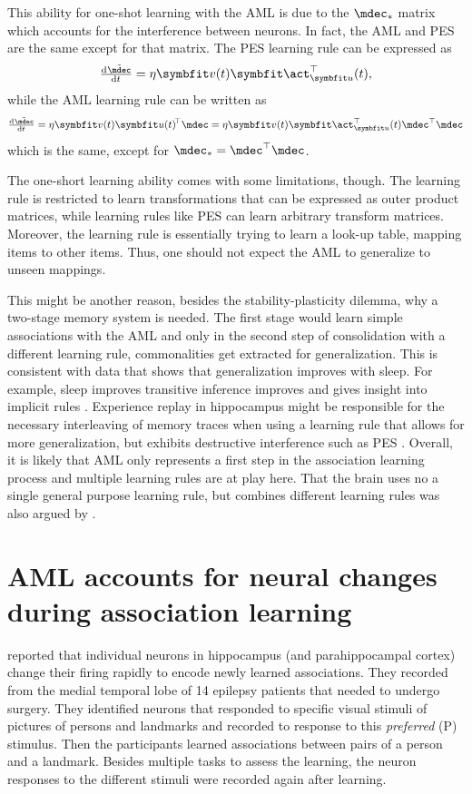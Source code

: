 This ability for one-shot learning with the AML is due to the $\mdec_*$ matrix which accounts for the interference between neurons.
In fact, the AML and PES are the same except for that matrix.
The PES learning rule can be expressed as
\begin{equation}
    \od{\tilde{\mdec}}{t} = \eta \vc v(t) \vc\act_{\vc u}\Tr(t) \text{,}
\end{equation}
while the AML learning rule can be written as
\begin{equation}
    \od{\tilde{\mdec}}{t} = \eta \vc v(t) \vc u(t)\!\Tr \mdec = \eta \vc v(t) \vc\act_{\vc u}\Tr(t) \mdec\Tr \mdec
\end{equation}
which is the same, except for $\mdec_* = \mdec\Tr \mdec$.

The one-short learning ability comes with some limitations, though.
The learning rule is restricted to learn transformations that can be expressed as outer product matrices, while learning rules like PES can learn arbitrary transform matrices.
Moreover, the learning rule is essentially trying to learn a look-up table, mapping items to other items.
Thus, one should not expect the AML to generalize to unseen mappings.

This might be another reason, besides the stability-plasticity dilemma, why a two-stage memory system is needed.
The first stage would learn simple associations with the AML and only in the second step of consolidation with a different learning rule, commonalities get extracted for generalization.
This is consistent with data that shows that generalization improves with sleep.
For example, sleep improves transitive inference improves \parencite{stickgold2013-2} and gives insight into implicit rules \parencite{wagner2004}.
Experience replay in hippocampus might be responsible for the necessary interleaving of memory traces when using a learning rule that allows for more generalization, but exhibits destructive interference such as PES \parencite{kumaran2016}.
Overall, it is likely that AML only represents a first step in the association learning process and multiple learning rules are at play here.
That the brain uses no a single general purpose learning rule, but combines different learning rules was also argued by \textcite{gallistel2009}.


\section{AML accounts for neural changes during association learning}
\Textcite{ison2015} reported that individual neurons in hippocampus (and parahippocampal cortex) change their firing rapidly to encode newly learned associations.
They recorded from the medial temporal lobe of \num{14} epilepsy patients that needed to undergo surgery.
They identified neurons that responded to specific visual stimuli of pictures of persons and landmarks and recorded to response to this \emph{preferred} (P) stimulus.
Then the participants learned associations between pairs of a person and a landmark.
Besides multiple tasks to assess the learning, the neuron responses to the different stimuli were recorded again after learning.

